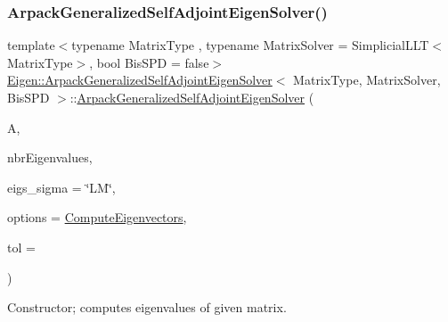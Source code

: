 \mbox{\label{class_eigen_1_1_arpack_generalized_self_adjoint_eigen_solver_a896d444b17b59c3b061800f579317a73}} 
\subsubsection{\texorpdfstring{Arpack\+Generalized\+Self\+Adjoint\+Eigen\+Solver()}{ArpackGeneralizedSelfAdjointEigenSolver()}\hspace{0.1cm}{\footnotesize\ttfamily [6/6]}}
{\footnotesize\ttfamily template$<$typename Matrix\+Type , typename Matrix\+Solver  = Simplicial\+L\+L\+T$<$\+Matrix\+Type$>$, bool Bis\+S\+PD = false$>$ \\
\hyperlink{class_eigen_1_1_arpack_generalized_self_adjoint_eigen_solver}{Eigen\+::\+Arpack\+Generalized\+Self\+Adjoint\+Eigen\+Solver}$<$ Matrix\+Type, Matrix\+Solver, Bis\+S\+PD $>$\+::\hyperlink{class_eigen_1_1_arpack_generalized_self_adjoint_eigen_solver}{Arpack\+Generalized\+Self\+Adjoint\+Eigen\+Solver} (\begin{DoxyParamCaption}\item[{const Matrix\+Type \&}]{A,  }\item[{Index}]{nbr\+Eigenvalues,  }\item[{std\+::string}]{eigs\+\_\+sigma = {\ttfamily \char`\"{}LM\char`\"{}},  }\item[{int}]{options = {\ttfamily \hyperlink{group__enums_ggae3e239fb70022eb8747994cf5d68b4a9ada93d8885bde32b876ba4af01d3292cc}{Compute\+Eigenvectors}},  }\item[{\hyperlink{class_eigen_1_1_arpack_generalized_self_adjoint_eigen_solver_a2555af55e53bf9de894a49e639be2e1e}{Real\+Scalar}}]{tol = {} }\end{DoxyParamCaption})\hspace{0.3cm}{\ttfamily [inline]}}



Constructor; computes eigenvalues of given matrix. 


